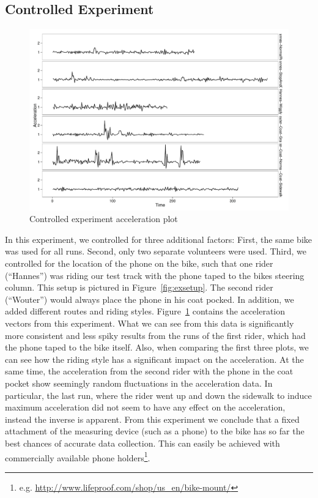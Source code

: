 \documentclass[a4paper,11pt]{article}
\begin{document}
\subsection{Controlled Experiment}

\begin{figure}
\centering
\includegraphics[width=13cm]{figures/accelerationplot-2}
\caption{Controlled experiment acceleration plot}
\label{fig:accplot2}
\end{figure}


In this experiment, we controlled for three additional factors: First, the same bike was used for all runs. Second, only two separate volunteers were used. Third, we controlled for the location of the phone on the bike, such that one rider (``Hannes'') was riding our test track with the phone taped to the bikes steering column. This setup is pictured in Figure~\ref{fig:exsetup}. The second rider (``Wouter'') would always place the phone in his coat pocked. In addition, we added different routes and riding styles. Figure~\ref{fig:accplot2} contains the acceleration vectors from this experiment. What we can see from this data is significantly more consistent and less spiky results from the runs of the first rider, which had the phone taped to the bike itself. Also, when comparing the first three plots, we can see how the riding style has a significant impact on the acceleration. At the same time, the acceleration from the second rider with the phone in the coat pocket show seemingly random fluctuations in the acceleration data. In particular, the last run, where the rider went up and down the sidewalk to induce maximum acceleration did not seem to have any effect on the acceleration, instead the inverse is apparent. From this experiment we conclude that a fixed attachment of the measuring device (such as a phone) to the bike has so far the best chances of accurate data collection. This can easily be achieved with commercially available phone holders\footnote{e.g. \url{http://www.lifeproof.com/shop/us_en/bike-mount/}}.
\end{document}
